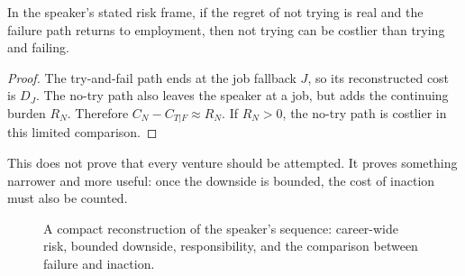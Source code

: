 \begin{proposition}
In the speaker's stated risk frame, if the regret of not trying is real and the failure path returns to employment, then not trying can be costlier than trying and failing.
\end{proposition}

\begin{proof}
The try-and-fail path ends at the job fallback \(J\), so its reconstructed cost is \(D_J\). The no-try path also leaves the speaker at a job, but adds the continuing burden \(R_N\). Therefore \(C_N - C_{T|F} \approx R_N\). If \(R_N>0\), the no-try path is costlier in this limited comparison.
\end{proof}

This does not prove that every venture should be attempted. It proves something narrower and more useful: once the downside is bounded, the cost of inaction must also be counted.

\begin{figure}
\centering
{}
\caption{A compact reconstruction of the speaker's sequence: career-wide risk, bounded downside, responsibility, and the comparison between failure and inaction.}
\end{figure}

